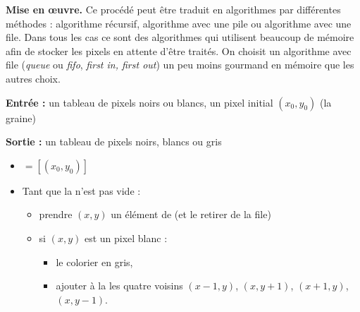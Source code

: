 \documentclass[11pt,class=report,crop=false]{standalone}
\begin{document}
\textbf{Mise en \oe uvre.} Ce procédé peut être traduit en algorithmes par différentes méthodes : algorithme récursif, algorithme avec une pile ou algorithme avec une file. Dans tous les cas ce sont des algorithmes qui utilisent beaucoup de mémoire afin de stocker les pixels en attente d'être traités. 
On choisit un algorithme avec file (\emph{queue} ou \emph{fifo}, \emph{first in, first out}) un peu moins gourmand en mémoire que les autres choix.

\begin{algorithme}

\textbf{Entrée :} un tableau de pixels noirs ou blancs, un pixel initial $(x_0,y_0)$ (la graine)

\textbf{Sortie :} un tableau de pixels noirs, blancs ou gris

\begin{itemize}
	\item {} $= [ (x_0,y_0)]$

	\item Tant que la  n'est pas vide :
	\begin{itemize}
		\item prendre $(x,y)$ un élément de  (et le retirer de la file)
		\item si $(x,y)$ est un pixel blanc :
		\begin{itemize}
			\item le colorier en gris,
			\item ajouter à la  les quatre voisins $(x-1,y)$, $(x,y+1)$, $(x+1,y)$, $(x,y-1)$.
		\end{itemize}
	\end{itemize}
\end{itemize}
\end{algorithme}
\end{document}
